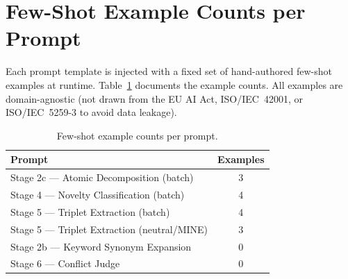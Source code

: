 \section{Few-Shot Example Counts per Prompt}
\label{app:fewshot-counts}

Each prompt template is injected with a fixed set of hand-authored
few-shot examples at runtime.  Table~\ref{tab:fewshot} documents the
example counts.  All examples are domain-agnostic (not drawn from the
EU AI Act, ISO/IEC~42001, or ISO/IEC~5259-3 to avoid data leakage).

\begin{table}[h]
\centering
\small
\caption{Few-shot example counts per prompt.}
\label{tab:fewshot}
\begin{tabular}{lc}
\toprule
\textbf{Prompt} & \textbf{Examples} \\
\midrule
Stage 2c — Atomic Decomposition (batch)       & 3 \\
Stage 4  — Novelty Classification (batch)     & 4 \\
Stage 5  — Triplet Extraction (batch)         & 4 \\
Stage 5  — Triplet Extraction (neutral/MINE)  & 3 \\
Stage 2b — Keyword Synonym Expansion          & 0 \\
Stage 6  — Conflict Judge                     & 0 \\
\bottomrule
\end{tabular}
\end{table}
